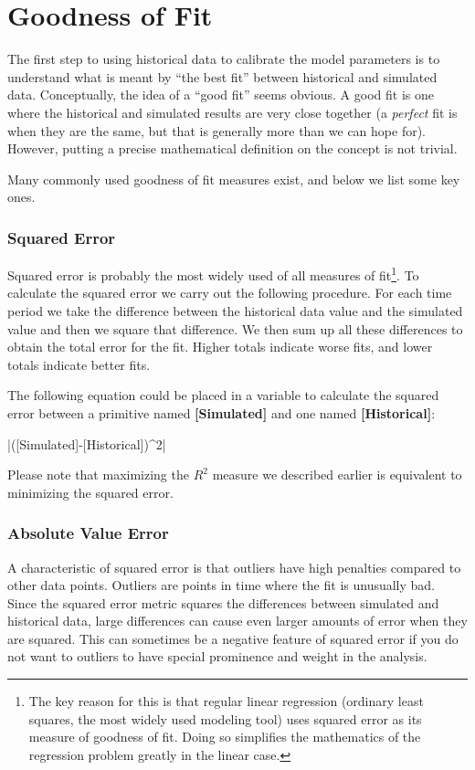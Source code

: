 \documentclass[]{memoir}
\newcommand{\DecValTok}[1]{\textcolor[rgb]{0.25,0.63,0.44}{{#1}}}
\newcommand{\NormalTok}[1]{{#1}}
\newcommand{\p}[1]{\textbf{{[}#1{]}}}
\begin{document}
\section{Goodness of Fit}

The first step to using historical data to calibrate the model
parameters is to understand what is meant by ``the best fit'' between
historical and simulated data. Conceptually, the idea of a ``good fit''
seems obvious. A good fit is one where the historical and simulated
results are very close together (a \emph{perfect} fit is when they are
the same, but that is generally more than we can hope for). However,
putting a precise mathematical definition on the concept is not trivial.

Many commonly used goodness of fit measures exist, and below we list
some key ones.

\subsubsection{Squared Error}

Squared error is probably the most widely used of all measures of
fit\footnote{The key reason for this is that regular linear regression
  (ordinary least squares, the most widely used modeling tool) uses
  squared error as its measure of goodness of fit. Doing so simplifies
  the mathematics of the regression problem greatly in the linear case.}.
To calculate the squared error we carry out the following procedure. For
each time period we take the difference between the historical data
value and the simulated value and then we square that difference. We
then sum up all these differences to obtain the total error for the fit.
Higher totals indicate worse fits, and lower totals indicate better
fits.

The following equation could be placed in a variable to calculate the
squared error between a primitive named \p{Simulated} and one named
\p{Historical}:

|\NormalTok{([Simulated]-[Historical])^}\DecValTok{2}|

Please note that maximizing the $R^2$ measure we described earlier is
equivalent to minimizing the squared error.

\subsubsection{Absolute Value Error}

A characteristic of squared error is that outliers have high penalties
compared to other data points. Outliers are points in time where the fit
is unusually bad. Since the squared error metric squares the differences
between simulated and historical data, large differences can cause even
larger amounts of error when they are squared. This can sometimes be a
negative feature of squared error if you do not want to outliers to have
special prominence and weight in the analysis.
\end{document}
